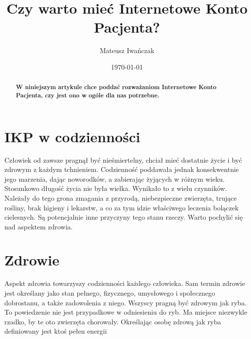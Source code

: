 \documentclass[11pt,a4paper]{article}
\title{Czy warto mieć Internetowe Konto Pacjenta?}
\author{Mateusz Iwańczak}
\date{\today}
\begin{document}
\maketitle

\begin{abstract}
\textbf{W niniejszym artykule chce poddać rozważaniom Internetowe Konto Pacjenta, czy jest ono w ogóle dla nas potrzebne.}
\end{abstract}

\section{IKP w codzienności}\label{sec:IKP}
Człowiek od zawsze pragnął być nieśmiertelny, chciał mieć dostatnie życie i być zdrowym z każdym tchnieniem. Codzienność poddawała jednak konsekwentnie jego marzenia, dając noworodków, a zabierając żyjących w różnym wieku. Stosunkowo długość życia nie była wielka. Wynikało to z wielu czynników. Należały do tego grona zmagania z przyrodą, niebezpieczne zwierzęta, trujące rośliny, brak higieny i lekarstw, a co za tym idzie właściwego leczenia bolączek cielesnych. Są potencjalnie inne przyczyny tego stanu rzeczy. Warto pochylić się nad aspektem zdrowia. 

\section{Zdrowie}\label{sec:zdrowie}
Aspekt zdrowia towarzyszy codzienności każdego człowieka. Sam termin zdrowie jest określany jako stan pełnego, fizycznego, umysłowego i społecznego dobrostanu, a także zadowolenia z niego. Wszyscy pragną być zdrowym jak ryba. To powiedzenie nie jest przypadkowe w odniesieniu do ryb. Ma miejsce niezwykle rzadko, by te oto zwierzęta chorowały. Określając osobę zdrową jak ryba definiowany jest ktoś pełen energii
\end{document}
